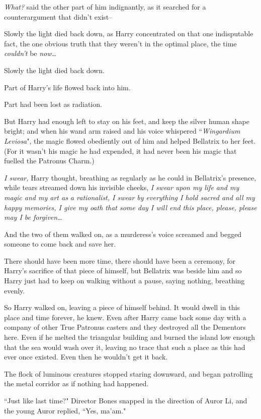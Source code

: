 \emph{What?} said the other part of him indignantly, as it searched for a counterargument that didn't exist\---

Slowly the light died back down, as Harry concentrated on that one indisputable fact, the one obvious truth that they weren't in the optimal place, the time \emph{couldn't} be \emph{now{\ldots}}

Slowly the light died back down.

Part of Harry's life flowed back into him.

Part had been lost as radiation.

But Harry had enough left to stay on his feet, and keep the silver human shape bright; and when his wand arm raised and his voice whispered ``\emph{Wingardium Leviosa}", the magic flowed obediently out of him and helped Bellatrix to her feet. (For it wasn't his magic he had expended, it had never been his magic that fuelled the Patronus Charm.)

\emph{I swear,} Harry thought, breathing as regularly as he could in Bellatrix's presence, while tears streamed down his invisible cheeks, \emph{I swear upon my life and my magic and my art as a rationalist, I swear by everything I hold sacred and all my happy memories, I give my oath that some day I will end this place, please, please may I be forgiven{\ldots}}

And the two of them walked on, as a murderess's voice screamed and begged someone to come back and save her.

There should have been more time, there should have been a ceremony, for Harry's sacrifice of that piece of himself, but Bellatrix was beside him and so Harry just had to keep on walking without a pause, saying nothing, breathing evenly.

So Harry walked on, leaving a piece of himself behind. It would dwell in this place and time forever, he knew. Even after Harry came back some day with a company of other True Patronus casters and they destroyed all the Dementors here. Even if he melted the triangular building and burned the island low enough that the sea would wash over it, leaving no trace that such a place as this had ever once existed. Even then he wouldn't get it back.

\later

The flock of luminous creatures stopped staring downward, and began patrolling the metal corridor as if nothing had happened.

``Just like last time?" Director Bones snapped in the direction of Auror Li, and the young Auror replied, ``Yes, ma'am."

